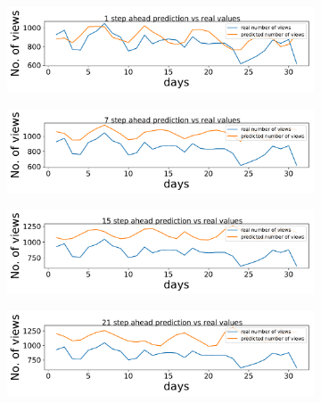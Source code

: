   \begin{figure}[]
      \begin{subfigure}[h]{1\textwidth}
          \includegraphics[width=\textwidth]{./results/images/1stepAhead}
      \end{subfigure}
	  
      \begin{subfigure}[h]{1\textwidth}
          \includegraphics[width=\textwidth]{./results/images/7stepAhead}
      \end{subfigure}
	  
      \begin{subfigure}[h]{1\textwidth}
          \includegraphics[width=\textwidth]{./results/images/15stepAhead}
      \end{subfigure}
	  
      \begin{subfigure}[h]{1\textwidth}
          \includegraphics[width=\textwidth]{./results/images/21stepAhead}
      \end{subfigure}
	  

\end{figure}

